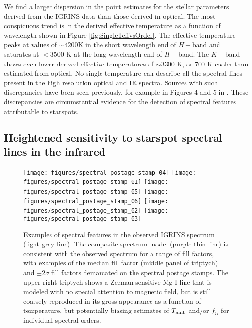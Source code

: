 \documentclass[twocolumn]{emulateapj}%
\begin{document}
We find a larger dispersion in the point estimates for the stellar parameters derived from the IGRINS data than those derived in optical.  The most conspicuous trend is in the derived effective temperature as a function of wavelength shown in Figure \ref{fig:SingleTeffvsOrder}.  The effective temperature peaks at values of $\sim4200$K in the short wavelength end of $H-$band and saturates at $<3500$ K at the long wavelength end of $H-$band.  The $K-$band shows even lower derived effective temperatures of $\sim3300$ K, or 700 K cooler than estimated from optical.  No single temperature can describe all the spectral lines present in the high resolution optical and IR spectra.  
Sources with such discrepancies have been seen previously, for example in Figures 4 and 5 in \citet{bouvier92}.
  These discrepancies are circumstantial evidence for the detection of spectral features attributable to starspots.


\subsection{Heightened sensitivity to starspot spectral lines in the infrared}\label{sec:whyNearIR}

\begin{figure*}
 \centering
 \texttt{[image: figures/spectral\_postage\_stamp\_04]} 
 \texttt{[image: figures/spectral\_postage\_stamp\_01]} 
 \texttt{[image: figures/spectral\_postage\_stamp\_05]} 
 \texttt{[image: figures/spectral\_postage\_stamp\_06]} 
 \texttt{[image: figures/spectral\_postage\_stamp\_02]} 
 \texttt{[image: figures/spectral\_postage\_stamp\_03]} 
 \caption{Examples of spectral features in the observed IGRINS spectrum (light gray line).  The composite spectrum model (purple thin line) is consistent with the observed spectrum for a range of fill factors, with examples of the median fill factor (middle panel of triptych) and $\pm2\sigma$ fill factors demarcated on the spectral postage stamps.  The upper right triptych shows a Zeeman-sensitive Mg I line that is modeled with no special attention to magnetic field, but is still coarsely reproduced in its gross appearance as a function of temperature, but potentially biasing estimates of $T_\textrm{amb}$ and/or $f_{\Omega}$ for individual spectral orders.}
 \label{fig:specPostageStamp}
\end{figure*}
\end{document}
